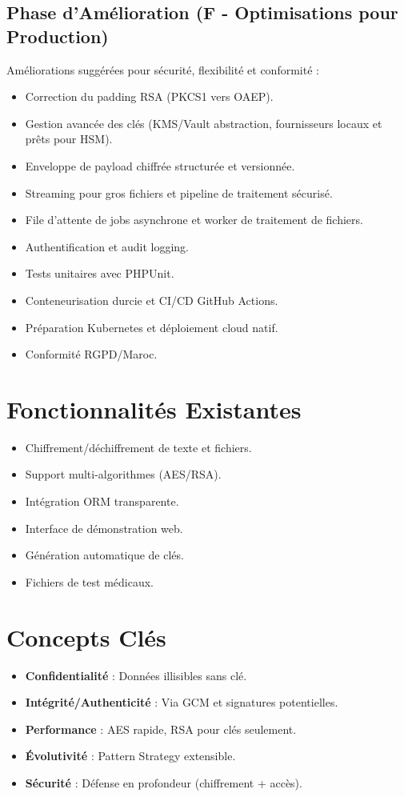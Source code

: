 \documentclass{article}
\begin{document}
\subsection{Phase d'Amélioration (F - Optimisations pour Production)}
Améliorations suggérées pour sécurité, flexibilité et conformité :
\begin{itemize}
    \item Correction du padding RSA (PKCS1 vers OAEP).
    \item Gestion avancée des clés (KMS/Vault abstraction, fournisseurs locaux et prêts pour HSM).
    \item Enveloppe de payload chiffrée structurée et versionnée.
    \item Streaming pour gros fichiers et pipeline de traitement sécurisé.
    \item File d'attente de jobs asynchrone et worker de traitement de fichiers.
    \item Authentification et audit logging.
    \item Tests unitaires avec PHPUnit.
    \item Conteneurisation durcie et CI/CD GitHub Actions.
    \item Préparation Kubernetes et déploiement cloud natif.
    \item Conformité RGPD/Maroc.
\end{itemize}

\section{Fonctionnalités Existantes}
\begin{itemize}
    \item Chiffrement/déchiffrement de texte et fichiers.
    \item Support multi-algorithmes (AES/RSA).
    \item Intégration ORM transparente.
    \item Interface de démonstration web.
    \item Génération automatique de clés.
    \item Fichiers de test médicaux.
\end{itemize}

\section{Concepts Clés}
\begin{itemize}
    \item \textbf{Confidentialité} : Données illisibles sans clé.
    \item \textbf{Intégrité/Authenticité} : Via GCM et signatures potentielles.
    \item \textbf{Performance} : AES rapide, RSA pour clés seulement.
    \item \textbf{Évolutivité} : Pattern Strategy extensible.
    \item \textbf{Sécurité} : Défense en profondeur (chiffrement + accès).
\end{itemize}
\end{document}
